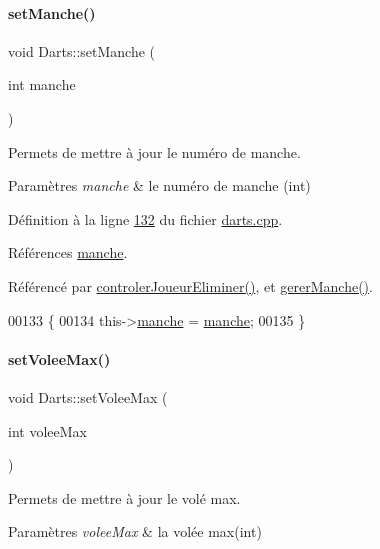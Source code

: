 \paragraph{\texorpdfstring{set\+Manche()}{setManche()}}
{\footnotesize\ttfamily void Darts\+::set\+Manche (\begin{DoxyParamCaption}\item[{int}]{manche }\end{DoxyParamCaption})}



Permets de mettre à jour le numéro de manche. 


\begin{DoxyParams}{Paramètres}
{\em manche} & le numéro de manche (int) \\
\hline
\end{DoxyParams}


Définition à la ligne \hyperlink{darts_8cpp_source_l00132}{132} du fichier \hyperlink{darts_8cpp_source}{darts.\+cpp}.



Références \hyperlink{darts_8h_source_l00077}{manche}.



Référencé par \hyperlink{darts_8cpp_source_l00349}{controler\+Joueur\+Eliminer()}, et \hyperlink{darts_8cpp_source_l00303}{gerer\+Manche()}.


\begin{DoxyCode}
00133 \{
00134     this->\hyperlink{class_darts_ac7b7bd23e64b4fab3895f02f085ea85f}{manche} = \hyperlink{class_darts_ac7b7bd23e64b4fab3895f02f085ea85f}{manche};
00135 \}
\end{DoxyCode}
\mbox{\label{class_darts_a982dda6ea65e4ada297cc562617fc3ba}} 
\paragraph{\texorpdfstring{set\+Volee\+Max()}{setVoleeMax()}}
{\footnotesize\ttfamily void Darts\+::set\+Volee\+Max (\begin{DoxyParamCaption}\item[{int}]{volee\+Max }\end{DoxyParamCaption})}



Permets de mettre à jour le volé max. 


\begin{DoxyParams}{Paramètres}
{\em volee\+Max} & la volée max(int) \\
\hline
\end{DoxyParams}


